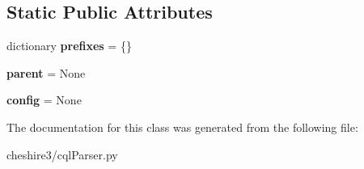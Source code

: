 \subsection*{Static Public Attributes}
\begin{DoxyCompactItemize}
\item 
\hypertarget{classcheshire3_1_1cql_parser_1_1_prefixable_object_a9e8ef13ad17bfb7550634073d9aea4f2}{dictionary {\bfseries prefixes} = \{\}}\label{classcheshire3_1_1cql_parser_1_1_prefixable_object_a9e8ef13ad17bfb7550634073d9aea4f2}

\item 
\hypertarget{classcheshire3_1_1cql_parser_1_1_prefixable_object_a37ae1d885d479a149854b8836a0292bf}{{\bfseries parent} = None}\label{classcheshire3_1_1cql_parser_1_1_prefixable_object_a37ae1d885d479a149854b8836a0292bf}

\item 
\hypertarget{classcheshire3_1_1cql_parser_1_1_prefixable_object_aa10aa63c8d381801d23402650eee01c0}{{\bfseries config} = None}\label{classcheshire3_1_1cql_parser_1_1_prefixable_object_aa10aa63c8d381801d23402650eee01c0}

\end{DoxyCompactItemize}


The documentation for this class was generated from the following file\-:\begin{DoxyCompactItemize}
\item 
cheshire3/cql\-Parser.\-py\end{DoxyCompactItemize}
